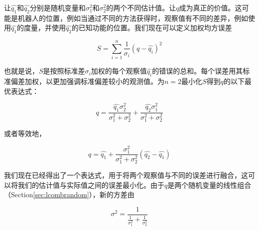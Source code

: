 让$\hat{q_1}$和$\hat{q_2}$分别是随机变量和$\sigma^2_1$和$\sigma^2_2$的两个不同估计值。让$q$成为真正的价值。这可能是机器人的位置，例如当通过不同的方法获得时，观察值有不同的差异，例如使用$\hat{q_1}$的度量，并使用$\hat{q_2}$的已知功能的位置。我们现在可以定义加权均方误差

 \begin{equation}
S=\displaystyle\sum_{i=1}^{n}\frac{1}{\sigma_i} (q-\hat{q_i})^2
\end{equation}


也就是说，$S$是按照标准差$\sigma_i$加权的每个观察值$\hat{q_i}$的错误的总和。每个误差用其标准偏差加权，以更加强调标准偏差较小的观测值。为$n=2$最小化$S$得到$q$的以下最优表达式：

\begin{equation}
q=\frac{\hat{q_1}\sigma_2^2}{\sigma_1^2+\sigma_2^2}+\frac{\hat{q_2}\sigma_1^2}{\sigma_1^2+\sigma_2^2}
\end{equation}

或者等效地，

\begin{equation}
q=\hat{q_1}+\frac{\sigma_1^2}{\sigma_1^2+\sigma_2^2}(\hat{q_2}-\hat{q_1})\label{eq:optimalfusion}
\end{equation}


我们现在已经得出了一个表达式，用于将两个观察值与不同的误差进行融合，这可以将我们的估计值与实际值之间的误差最小化。由于$q$是两个随机变量的线性组合（Section\ref{sec:lcombrandom}），新的方差由

\begin{equation}
\sigma^2=\frac{1}{\frac{1}{\sigma_1^2}+\frac{1}{\sigma_2^2}}
\end{equation}


